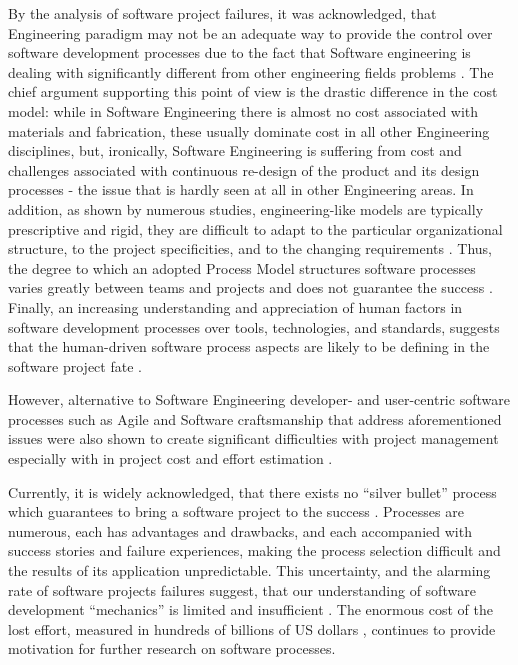 By the analysis of software project failures, it was acknowledged, that Engineering paradigm 
may not be an adequate way to provide the control over software development processes 
due to the fact that Software engineering is dealing with significantly different from other engineering 
fields problems \cite{citeulike:3729379} \cite{citeulike:5203446} \cite{citeulike:2207657}.
The chief argument supporting this point of view is the drastic difference in the cost model:
while in Software Engineering there is almost no cost associated with materials and 
fabrication, these usually dominate cost in all other Engineering disciplines, but, 
ironically, Software Engineering is suffering from cost and challenges associated with 
continuous re-design of the product and its design processes - the issue that is 
hardly seen at all in other Engineering areas. 
In addition, as shown by numerous studies, engineering-like models are typically prescriptive and rigid,
they are difficult to adapt to the particular organizational structure, to the project specificities, 
and to the changing requirements \cite{citeulike:113403}. 
Thus, the degree to which an adopted Process Model structures software processes varies greatly 
between teams and projects and does not guarantee the success \cite{sacchi_2001}. 
Finally, an increasing understanding and appreciation of human factors in software development 
processes over tools, technologies, and standards, suggests that the human-driven software 
process aspects are likely to be defining in the software project fate \cite{citeulike:6580825} 
\cite{citeulike:149387} \cite{1605185} \cite{citeulike:113403} \cite{citeulike:12743107}. 

However, alternative to Software Engineering developer- and user-centric software processes 
such as Agile and Software craftsmanship that address aforementioned issues were also shown to 
create significant difficulties with project management especially with in project cost and effort 
estimation \cite{citeulike:12933080} \cite{citeulike:9928907}.

Currently, it is widely acknowledged, that there exists no ``silver bullet'' process which 
guarantees to bring a software project to the success \cite{citeulike:1986013}. 
Processes are numerous, each has advantages and drawbacks, and each accompanied with 
success stories and failure experiences, making the process selection difficult 
and the results of its application unpredictable.
This uncertainty, and the alarming rate of software projects failures suggest, that our understanding 
of software development ``mechanics'' is limited and insufficient \cite{citeulike:12550665}. 
The enormous cost of the lost effort, measured in hundreds of billions of US dollars 
\cite{citeulike:2207657} \cite{citeulike:2207653} \cite{citeulike:2207655}, 
continues to provide motivation for further research on software processes. 


